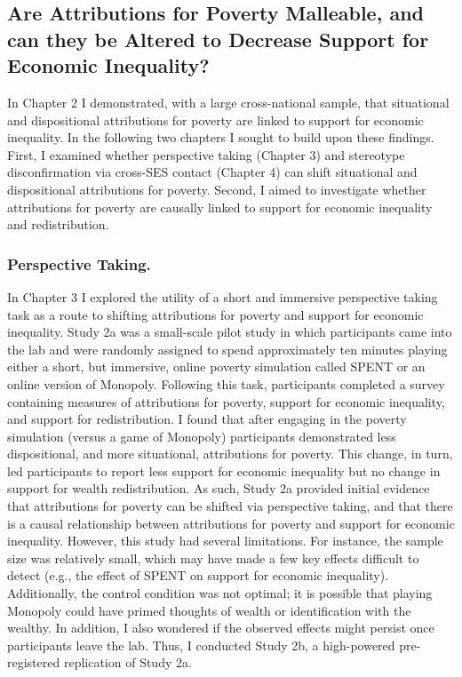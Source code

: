 \documentclass{sfuthesis}
\begin{document}
\subsection{Are Attributions for Poverty Malleable, and can they be Altered to Decrease Support for Economic Inequality?}

In Chapter 2 I demonstrated, with a large cross-national sample, that situational and dispositional attributions for poverty are linked to support for economic inequality. In the following two chapters I sought to build upon these findings. First, I examined whether perspective taking (Chapter 3) and stereotype disconfirmation via cross-SES contact (Chapter 4) can shift situational and dispositional attributions for poverty. Second, I aimed to investigate whether attributions for poverty are causally linked to support for economic inequality and redistribution.

\subsubsection{Perspective Taking.}

In Chapter 3 I explored the utility of a short and immersive perspective taking task as a route to shifting attributions for poverty and support for economic inequality. Study 2a was a small-scale pilot study in which participants came into the lab and were randomly assigned to spend approximately ten minutes playing either a short, but immersive, online poverty simulation called SPENT or an online version of Monopoly. Following this task, participants completed a survey containing measures of attributions for poverty, support for economic inequality, and support for redistribution. I found that after engaging in the poverty simulation (versus a game of Monopoly) participants demonstrated less dispositional, and more situational, attributions for poverty. This change, in turn, led participants to report less support for economic inequality but no change in support for wealth redistribution. As such, Study 2a provided initial evidence that attributions for poverty can be shifted via perspective taking, and that there is a causal relationship between attributions for poverty and support for economic inequality. However, this study had several limitations. For instance, the sample size was relatively small, which may have made a few key effects difficult to detect (e.g., the effect of SPENT on support for economic inequality). Additionally, the control condition was not optimal; it is possible that playing Monopoly could have primed thoughts of wealth or identification with the wealthy. In addition, I also wondered if the observed effects might persist once participants leave the lab. Thus, I conducted Study 2b, a high-powered pre-registered replication of Study 2a.
	
\end{document}
